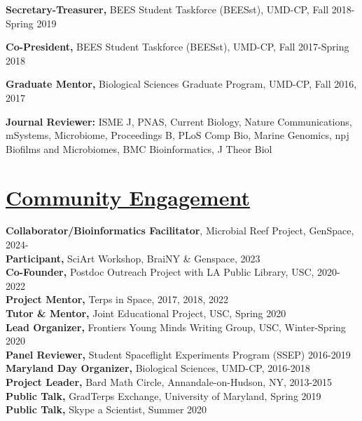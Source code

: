 \documentclass[]{res}
\begin{document}
\begin{resume}
{\bf Secretary-Treasurer,} {BEES Student Taskforce (BEESst)}, UMD-CP, Fall 2018-Spring 2019 %

{\bf Co-President,} {BEES Student Taskforce (BEESst)}, UMD-CP, Fall 2017-Spring 2018

{\bf Graduate Mentor,} {Biological Sciences Graduate Program}, UMD-CP, Fall 2016, 2017 %

{\bf Journal Reviewer:} ISME J, PNAS, Current Biology, Nature Communications, mSystems, Microbiome, Proceedings B, PLoS Comp Bio, Marine Genomics, npj Biofilms and Microbiomes, BMC Bioinformatics, J Theor Biol

\section{\underline{Community Engagement}}\vspace{2mm}
{\bf Collaborator/Bioinformatics Facilitator}, Microbial Reef Project, GenSpace, 2024-\\
{\bf Participant,} SciArt Workshop, BraiNY \& Genspace, 2023\\
{\bf Co-Founder,} Postdoc Outreach Project with LA Public Library, USC, 2020-2022\\
{\bf Project Mentor,} Terps in Space, 2017, 2018, 2022\\
{\bf Tutor \& Mentor,} Joint Educational Project, USC, Spring 2020\\
{\bf Lead Organizer,} Frontiers Young Minds Writing Group, USC, Winter-Spring 2020\\
{\bf Panel Reviewer,} Student Spaceflight Experiments Program (SSEP) 2016-2019\\
{\bf Maryland Day Organizer,} Biological Sciences, UMD-CP, 2016-2018\\
{\bf Project Leader,} Bard Math Circle, Annandale-on-Hudson, NY, 2013-2015 \\
{\bf Public Talk,} GradTerps Exchange, University of Maryland, Spring 2019\\
{\bf Public Talk,} Skype a Scientist, Summer 2020

  

\end{resume}
\end{document}

